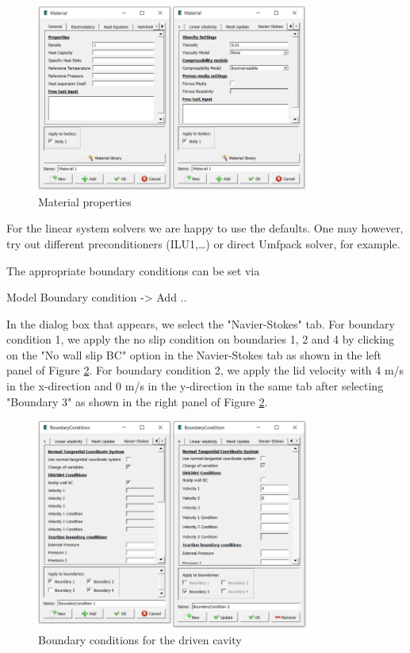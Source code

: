 \begin{figure}[H]
\centering
\includegraphics[width=0.8\textwidth]{DC_material}
\caption{Material properties}\label{fg:DC_material}
\end{figure}

For the linear system solvers we are happy to use the defaults. One may however, try out different preconditioners (ILU1,\ldots) or direct Umfpack solver, for example.

The appropriate boundary conditions can be set via  

\ttbegin
Model
  Boundary condition -> Add ..
\ttend

In the dialog box that appears, we select the "Navier-Stokes" tab. 
For boundary condition 1, we apply the no slip condition on boundaries 1, 2 and 4 by clicking on the
"No wall slip BC" option in the Navier-Stokes tab as shown in the left panel of Figure \ref{fg:DC_boundary}. 
For boundary condition 2, we apply the lid velocity with 4 m/s in the x-direction and 0 m/s in the y-direction  in the same tab after selecting "Boundary 3" as shown in the right panel of Figure \ref{fg:DC_boundary}.

\begin{figure}[H]
\centering
\includegraphics[width=0.8\textwidth]{DC_boundary}
\caption{Boundary conditions for the driven cavity}\label{fg:DC_boundary}
\end{figure}


